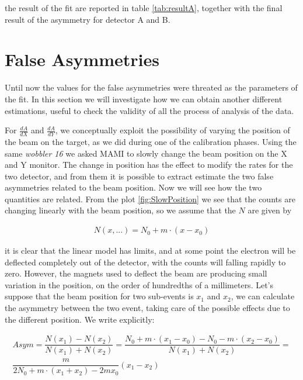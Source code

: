 
the result of the fit are reported in table \ref{tab:resultA}, together with the final result of the asymmetry for detector A and B.



\section{False Asymmetries}

Until now the values for the false asymmetries were threated as the parameters of the fit. In this section we will investigate how we can obtain another different estimations, useful to check the validity of all the process of analysis of the data.

For $\frac{dA}{dX}$ and $\frac{dA}{dY}$, we conceptually exploit the possibility of varying the position of the beam on the target, as we did during one of the calibration phases. Using the same \textit{wobbler 16} we asked MAMI to slowly change the beam position on the X and Y monitor. The change in position has the effect to modify the rates for the two detector, and from them it is possible to extract estimate the two false asymmetries related to the beam position. Now we will see how the two quantities are related.
From the plot \ref{fig:SlowPosition} we see that the counts are changing linearly with the beam position, so we assume that the $N$ are given by

\begin{align*}
N(x,...) = N_{0} + m \cdot (x - x_{0})
\end{align*}

it is clear that the linear model has limits, and at some point the electron will be deflected completely out of the detector, with the counts will falling rapidly to zero. However, the magnets used to deflect the beam are producing small variation in the position, on the order of hundredths of a millimeters.
Let's suppose that the beam position for two sub-events is $x_{1}$ and $x_{2}$, we can calculate the asymmetry between the two event, taking care of the possible effects due to the different position. We write explicitly: 

\begin{equation}
\begin{split}
Asym = \dfrac{N(x_{1}) - N(x_{2})}{N(x_{1}) + N(x_{2})} = \dfrac{N_{0} + m \cdot (x_{1} - x_{0}) - N_{0} - m \cdot (x_{2} - x_{0})}{N(x_{1}) + N(x_{2})} = \\ \dfrac{m}{2 N_{0} + m \cdot (x_{1} +  x_{2}) - 2m x_{0}}(x_{1} -  x_{2})
\end{split}
\end{equation}


